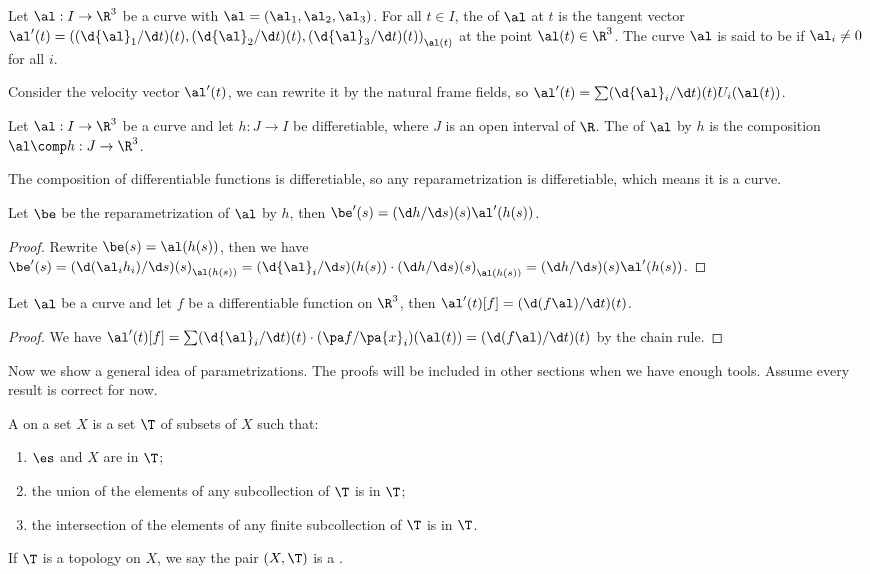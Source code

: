 \documentclass[12pt]{article}
\begin{document}
\begin{definition}
    Let $\al:I\to{\R}^{3}$ be a curve with $\al=({\al}_{1},{\al}_{2},{\al}_{3})$. For all $t\in I$, the  of $\al$ at $t$ is the tangent vector $\al'(t)={((\d{\al}_{1}/\d t)(t),(\d{\al}_{2}/\d t)(t),(\d{\al}_{3}/\d t)(t))}_{\al(t)}$ at the point $\al(t)\in{\R}^{3}$. The curve $\al$ is said to be  if ${\al}_{i}\ne 0$ for all $i$.
\end{definition}
\par
Consider the velocity vector $\al'(t)$, we can rewrite it by the natural frame fields, so $\al'(t)=\sum(\d{\al}_{i}/\d t)(t){U}_{i}(\al(t))$.
\begin{definition}
    Let $\al:I\to{\R}^{3}$ be a curve and let $h:J\to I$ be differetiable, where $J$ is an open interval of $\R$. The  of $\al$ by $h$ is the composition $\al\comp h:J\to{\R}^{3}$.
\end{definition}
\par
The composition of differentiable functions is differetiable, so any reparametrization is differetiable, which means it is a curve.
\begin{proposition}
    Let $\be$ be the reparametrization of $\al$ by $h$, then $\be'(s)=(\d h/\d s)(s)\al'(h(s))$.
\end{proposition}
\begin{proof}
    Rewrite $\be(s)=\al(h(s))$, then we have $\be'(s)={(\d({\al}_{i}{h}_{i})/\d s)(s)}_{\al(h(s))}={(\d{\al}_{i}/\d s)(h(s))\cdot(\d h/\d s)(s)}_{\al(h(s))}=(\d h/\d s)(s)\al'(h(s))$.
\end{proof}
\begin{proposition}
    Let $\al$ be a curve and let $f$ be a differentiable function on ${\R}^{3}$, then $\al'(t)[f]=(\d(f\al)/\d t)(t)$.
\end{proposition}
\begin{proof}
    We have $\al'(t)[f]=\sum(\d{\al}_{i}/\d t)(t)\cdot(\pa f/\pa{x}_{i})(\al(t))=(\d(f\al)/\d t)(t)$ by the chain rule.
\end{proof}
\par
Now we show a general idea of parametrizations. The proofs will be included in other sections when we have enough tools. Assume every result is correct for now.
\begin{definition}
    A  on a set $X$ is a set $\T$ of subsets of $X$ such that:
    \begin{enumerate}
        \item $\es$ and $X$ are in $\T$;
        \item the union of the elements of any subcollection of $\T$ is in $\T$;
        \item the intersection of the elements of any finite subcollection of $\T$ is in $\T$.
    \end{enumerate}
    If $\T$ is a topology on $X$, we say the pair $(X,\T)$ is a .
\end{definition}
\end{document}
